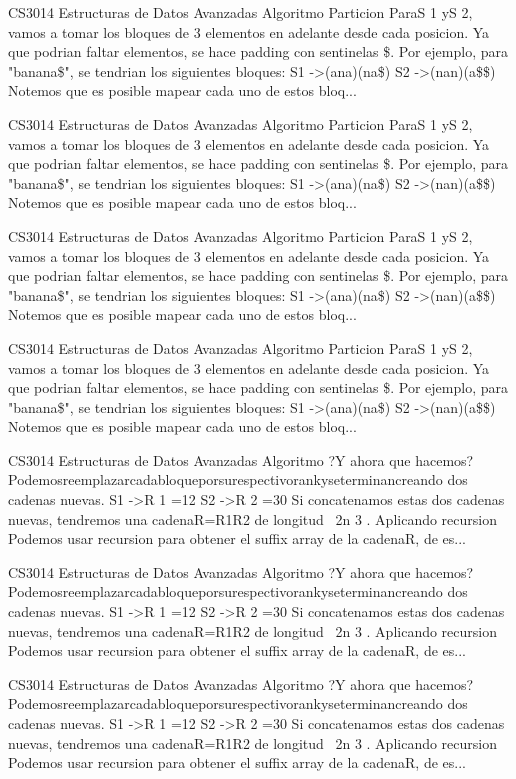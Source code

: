 \begin{description}[leftmargin=!,labelwidth=4.2em,style=nextline]
\item[Pag. 25] CS3014 Estructuras de Datos Avanzadas Algoritmo Particion ParaS 1 yS 2, vamos a tomar los bloques de 3 elementos en adelante desde cada posicion. Ya que podrian faltar elementos, se hace padding con sentinelas \$. Por ejemplo, para "banana\$", se tendrian los siguientes bloques: S1 ->(ana)(na\$) S2 ->(nan)(a\$\$) Notemos que es posible mapear cada uno de estos bloq...
\item[Pag. 26] CS3014 Estructuras de Datos Avanzadas Algoritmo Particion ParaS 1 yS 2, vamos a tomar los bloques de 3 elementos en adelante desde cada posicion. Ya que podrian faltar elementos, se hace padding con sentinelas \$. Por ejemplo, para "banana\$", se tendrian los siguientes bloques: S1 ->(ana)(na\$) S2 ->(nan)(a\$\$) Notemos que es posible mapear cada uno de estos bloq...
\item[Pag. 27] CS3014 Estructuras de Datos Avanzadas Algoritmo Particion ParaS 1 yS 2, vamos a tomar los bloques de 3 elementos en adelante desde cada posicion. Ya que podrian faltar elementos, se hace padding con sentinelas \$. Por ejemplo, para "banana\$", se tendrian los siguientes bloques: S1 ->(ana)(na\$) S2 ->(nan)(a\$\$) Notemos que es posible mapear cada uno de estos bloq...
\item[Pag. 28] CS3014 Estructuras de Datos Avanzadas Algoritmo Particion ParaS 1 yS 2, vamos a tomar los bloques de 3 elementos en adelante desde cada posicion. Ya que podrian faltar elementos, se hace padding con sentinelas \$. Por ejemplo, para "banana\$", se tendrian los siguientes bloques: S1 ->(ana)(na\$) S2 ->(nan)(a\$\$) Notemos que es posible mapear cada uno de estos bloq...
\item[Pag. 29] CS3014 Estructuras de Datos Avanzadas Algoritmo ?Y ahora que hacemos? Podemosreemplazarcadabloqueporsurespectivorankyseterminancreando dos cadenas nuevas. S1 ->R 1 =12 S2 ->R 2 =30 Si concatenamos estas dos cadenas nuevas, tendremos una cadenaR=R1R2 de longitud~ 2n 3 . Aplicando recursion Podemos usar recursion para obtener el suffix array de la cadenaR, de es...
\item[Pag. 30] CS3014 Estructuras de Datos Avanzadas Algoritmo ?Y ahora que hacemos? Podemosreemplazarcadabloqueporsurespectivorankyseterminancreando dos cadenas nuevas. S1 ->R 1 =12 S2 ->R 2 =30 Si concatenamos estas dos cadenas nuevas, tendremos una cadenaR=R1R2 de longitud~ 2n 3 . Aplicando recursion Podemos usar recursion para obtener el suffix array de la cadenaR, de es...
\item[Pag. 31] CS3014 Estructuras de Datos Avanzadas Algoritmo ?Y ahora que hacemos? Podemosreemplazarcadabloqueporsurespectivorankyseterminancreando dos cadenas nuevas. S1 ->R 1 =12 S2 ->R 2 =30 Si concatenamos estas dos cadenas nuevas, tendremos una cadenaR=R1R2 de longitud~ 2n 3 . Aplicando recursion Podemos usar recursion para obtener el suffix array de la cadenaR, de es...

\end{description}
